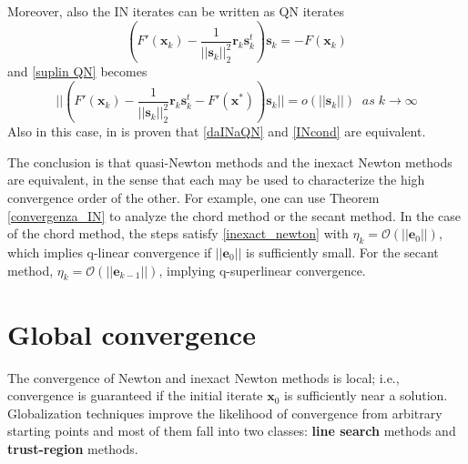       Moreover, also the IN iterates can be written as QN iterates 
      \begin{equation*}
     (F'(\textbf{x}_k)- \frac{1}{||\textbf{s}_k||^2_2} \textbf{r}_k \textbf{s}^t_k) \textbf{s}_k= -F(\textbf{x}_k)
      \end{equation*}
       and \eqref{suplin QN} becomes 
      \begin{equation}
      \label{daINaQN}
      ||(F'(\textbf{x}_k)- \frac{1}{||\textbf{s}_k||^2_2} \textbf{r}_k \textbf{s}^t_k - F'(\textbf{x}^*))\textbf{s}_k|| = o(||\textbf{s}_k||) \; \; as \; k\rightarrow \infty
      \end{equation}
    Also in this case, in \cite{Emil} is proven that \eqref{daINaQN} and \eqref{INcond} are equivalent.
    
   The conclusion is that quasi-Newton methods and the inexact Newton methods are equivalent, in the sense that each may be used to characterize the high convergence order of the other. For example, one can use Theorem \ref{convergenza_IN} to analyze the chord method or the secant method. In the case of the chord method, the steps satisfy \eqref{inexact_newton} with $\eta_k=\mathcal{O}(||\textbf{e}_0||)$, which implies q-linear convergence if $||\textbf{e}_0||$ is sufficiently small. For the secant method, $\eta_k = \mathcal{O}(||\textbf{e}_{k-1}||)$, implying q-superlinear convergence.
       
   \section{Global convergence} 
   The convergence of Newton and inexact Newton methods is local; i.e., convergence
   is guaranteed if the initial iterate $\textbf{x}_0$ is sufficiently near a solution. Globalization techniques improve the likelihood of convergence from arbitrary starting points and most of them fall into two classes: \textbf{line search} methods and \textbf{trust-region} methods.\\
